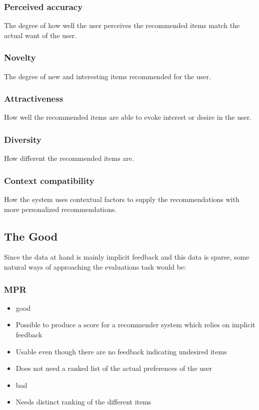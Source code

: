 
\subsubsection{Perceived accuracy}
The degree of how well the user perceives the recommended items match the actual want of the user.

\subsubsection{Novelty}
The degree of new and interesting items recommended for the user.

\subsubsection{Attractiveness}
How well the recommended items are able to evoke interest or desire in the user.

\subsubsection{Diversity}
How different the recommended items are.

\subsubsection{Context compatibility}
How the system uses contextual factors to supply the recommendations with more personalized recommendations.


\subsection{The Good}
Since the data at hand is mainly implicit feedback and this data is sparse, some natural ways of approaching the evaluations task would be:

\subsubsection{MPR}
\begin{itemize}
	\item good
	\item Possible to produce a score for a recommender system which relies on implicit feedback
	\item Usable even though there are no feedback indicating undesired items
	\item Does not need a ranked list of the actual preferences of the user
	\item bad
	\item Needs distinct ranking of the different items
\end{itemize}

